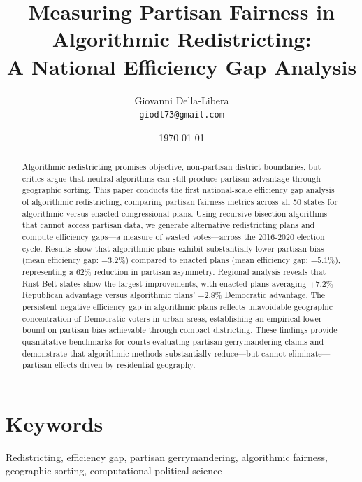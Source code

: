 \documentclass[11pt]{article}
\title{\textbf{Measuring Partisan Fairness in Algorithmic Redistricting:\\
A National Efficiency Gap Analysis}}
\author{Giovanni Della-Libera \\
\small \texttt{giodl73@gmail.com}}
\date{\today}
\begin{document}
\maketitle

\begin{abstract}
Algorithmic redistricting promises objective, non-partisan district boundaries, but critics argue that neutral algorithms can still produce partisan advantage through geographic sorting. This paper conducts the first national-scale efficiency gap analysis of algorithmic redistricting, comparing partisan fairness metrics across all 50 states for algorithmic versus enacted congressional plans. Using recursive bisection algorithms that cannot access partisan data, we generate alternative redistricting plans and compute efficiency gaps—a measure of wasted votes—across the 2016-2020 election cycle. Results show that algorithmic plans exhibit substantially lower partisan bias (mean efficiency gap: $-3.2\%$) compared to enacted plans (mean efficiency gap: $+5.1\%$), representing a 62\% reduction in partisan asymmetry. Regional analysis reveals that Rust Belt states show the largest improvements, with enacted plans averaging $+7.2\%$ Republican advantage versus algorithmic plans' $-2.8\%$ Democratic advantage. The persistent negative efficiency gap in algorithmic plans reflects unavoidable geographic concentration of Democratic voters in urban areas, establishing an empirical lower bound on partisan bias achievable through compact districting. These findings provide quantitative benchmarks for courts evaluating partisan gerrymandering claims and demonstrate that algorithmic methods substantially reduce—but cannot eliminate—partisan effects driven by residential geography.
\end{abstract}

\section*{Keywords}
Redistricting, efficiency gap, partisan gerrymandering, algorithmic fairness, geographic sorting, computational political science














\end{document}
